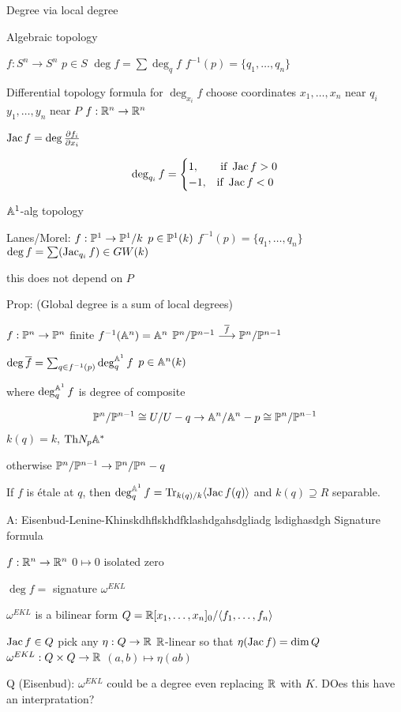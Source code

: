 Degree via local degree

Algebraic topology

$f: S^n \to S^n$ 
$p \in S$
$\deg f= \sum \deg_q f$
$f^{-1}(p)= \{q_1,\ldots,q_n\}$

Differential topology formula for $\deg_{x_i} f$
choose coordinates $x_1,\ldots,x_n$ near $q_i$
$y_1,\ldots,y_n$ near $P$
$f: \R^n \to \R^n$

$\jac f= \deg \frac{\partial f_i}{\partial x_i}$

	\[
	\deg_{q_i} f=
	\begin{cases}
	1, & \text{ if } \jac f >0 \\
	-1, & \text{if }\jac f<0
	\end{cases}
	\]



$\A^1$-alg topology

Lanes/Morel: $f: \P^1 \to \P^1/k$
$p \in \P^1(k)$
$f^{-1}(p)=\{q_1,\ldots,q_n\}$
$\deg f= \sum (\jac_{q_i} f) \in GW(k)$

this does not depend on $P$


Prop: (Global degree is a sum of local degrees)

$f: \P^n \to \P^n$ finite $f^{-1}(\A^n) = \A^n$
$\P^n/\P^{n-1} \ma{\overline{f}} \P^n/\P^{n-1}$


$\deg \overline{f}= \sum_{q \in f^{-1}(p)} \deg_q^{\A^1} f$
$p \in \A^n(k)$

where $\deg_q^{\A^1} f$ is degree of composite

	\[
	\P^n/\P^{n-1} \cong U/U-q \to \A^n /\A^n-p \cong \P^n/\P^{n-1}
	\]
$k(q)=k$, $\th N_p \A^*$

otherwise $\P^n/\P^{n-1} \to \P^n/\P^n - q$

If $f$ is \'etale at $q$, then $\deg_q^{\A^1} f = \tr_{k(q)/k} \langle \jac f(q) \rangle$
and $k(q) \supseteq R$ separable. 


A: Eisenbud-Lenine-Khinskdhflskhdfklashdgahsdgliadg lsdighasdgh Signature formula

$f: \R^n \to \R^n$
$0 \mapsto 0$ isolated zero

$\deg f=$ signature $\omega^{EKL}$

$\omega^{EKL}$ is a bilinear form
$Q= \R[x_1,\ldots,x_n]_0/\langle f_1,\ldots,f_n \rangle$

$\jac f \in Q$
pick any $\eta: Q \to \R$
$\R$-linear so that 
$\eta(\jac f)= \dim Q$
$\omega^{EKL}: Q \times Q \to \R$
$(a,b) \mapsto \eta(ab)$

Q (Eisenbud): $\omega^{EKL}$ could be a degree even replacing $\R$ with $K$. DOes this have an interpratation?

